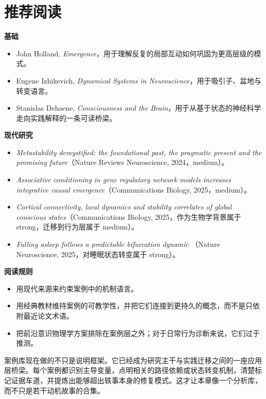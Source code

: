 \section{推荐阅读}

\begin{readingbox}
\textbf{基础}
\begin{itemize}[nosep]
  \item John Holland, \emph{Emergence}，用于理解反复的局部互动如何巩固为更高层级的模式。
  \item Eugene Izhikevich, \emph{Dynamical Systems in Neuroscience}，用于吸引子、盆地与转变语言。
  \item Stanislas Dehaene, \emph{Consciousness and the Brain}，用于从基于状态的神经科学走向实践解释的一条可读桥梁。
\end{itemize}
\textbf{现代研究}
\begin{itemize}[nosep]
  \item \emph{Metastability demystified: the foundational past, the pragmatic
        present and the promising future}（Nature Reviews Neuroscience, 2024，medium）。
  \item \emph{Associative conditioning in gene regulatory network models
        increases integrative causal emergence}（Communications Biology, 2025，medium）。
  \item \emph{Cortical connectivity, local dynamics and stability correlates of
        global conscious states}（Communications Biology, 2025，作为生物学背景属于 strong，迁移到行为层属于 medium）。
  \item \emph{Falling asleep follows a predictable bifurcation dynamic}
        （Nature Neuroscience, 2025，对睡眠状态转变属于 strong）。
\end{itemize}
\textbf{阅读规则}
\begin{itemize}[nosep]
  \item 用现代来源来约束案例中的机制语言。
  \item 用经典教材维持案例的可教学性，并把它们连接到更持久的概念，而不是只依附最近论文术语。
  \item 把前沿意识物理学方案排除在案例层之外；对于日常行为诊断来说，它们过于推测。
\end{itemize}
\end{readingbox}

\begin{summarybox}
案例库现在做的不只是说明框架。它已经成为研究主干与实践迁移之间的一座应用层桥梁。每个案例都识别主导变量，点明相关的路径依赖或状态转变机制，清楚标记证据车道，并提炼出能够超出轶事本身的修复模式。这才让本章像一个分析库，而不只是若干动机故事的合集。
\end{summarybox}